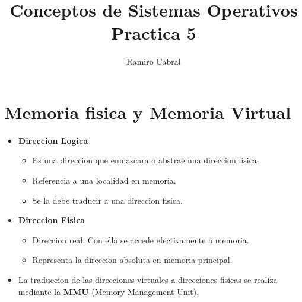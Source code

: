 \documentclass[12pt]{article}
\title{\Huge{Conceptos de Sistemas Operativos\\
Practica 5}}
\author{\huge{Ramiro Cabral}}
\date{\huge{}}
\begin{document}
\maketitle
\tableofcontents
\pagebreak

\section{Memoria fisica y Memoria Virtual}
\begin{itemize}
    \item \textbf{Direccion Logica}
        \begin{itemize}
            \item Es una direccion que enmascara o abstrae una direccion fisica.
            \item Referencia a una localidad en memoria.
            \item Se la debe traducir a una direccion fisica.
        \end{itemize}
    \item \textbf{Direccion Fisica}
        \begin{itemize}
            \item Direccion real. Con ella se accede efectivamente a memoria.
            \item Representa la direccion absoluta en memoria principal.
        \end{itemize}
    \item La traduccion de las direcciones virtuales a direcciones fisicas se realiza mediante la \textbf{MMU} (Memory Management Unit).
\end{itemize}
\end{document}
